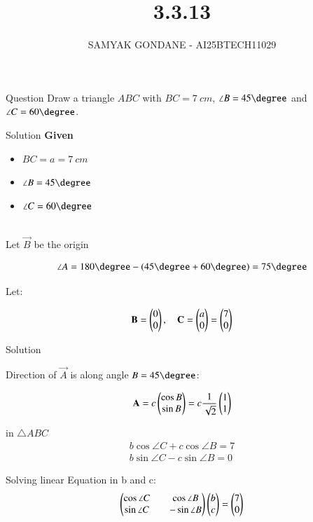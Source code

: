 \documentclass{beamer}
\title 
{3.3.13}
\date{}
\author
{SAMYAK GONDANE - AI25BTECH11029}
\begin{document}
\frame{\titlepage}

\begin{frame}{Question}
    Draw a triangle $ABC$ with $BC = 7\ cm$, $\angle B = 45\degree$ and $\angle C = 60\degree$.
\end{frame}

\begin{frame}{Solution}
\textbf{Given}
\begin{itemize}
    \item $BC = a = 7\ cm$
    \item $\angle B = 45\degree$
    \item $\angle C = 60\degree$
\end{itemize}
\\
Let $\vec{B}$ be the origin

\begin{align}
\angle A = 180\degree - (45\degree + 60\degree) = 75\degree
\end{align}

Let:

\begin{align}
\mathbf{B} = \begin{pmatrix}0 \\ 0\end{pmatrix}, \quad
\mathbf{C} = \begin{pmatrix}a \\ 0\end{pmatrix} = \begin{pmatrix}7 \\ 0\end{pmatrix}
\end{align}
\end{frame}

\begin{frame}{Solution}

Direction of $\vec{A}$ is along angle $B = 45\degree$:


\begin{align}
\mathbf{A} = c \begin{pmatrix}\cos B \\ \sin B\end{pmatrix}
= c \frac{1}{\sqrt{2}} \begin{pmatrix}1 \\ 1\end{pmatrix}
\end{align}

in $\triangle ABC$
\begin{align}
    b \cos \angle C + c \cos \angle B = 7\\
    b \sin \angle C - c \sin \angle B = 0
\end{align}

Solving linear Equation in b and c:
\begin{align}
    \begin{pmatrix}\cos \angle C && \cos \angle B \\
    \sin \angle C && -\sin \angle B\end{pmatrix} \begin{pmatrix}b \\ c\end{pmatrix} = \begin{pmatrix}7 \\ 0\end{pmatrix}
\end{align}
\end{frame}
\end{document}

